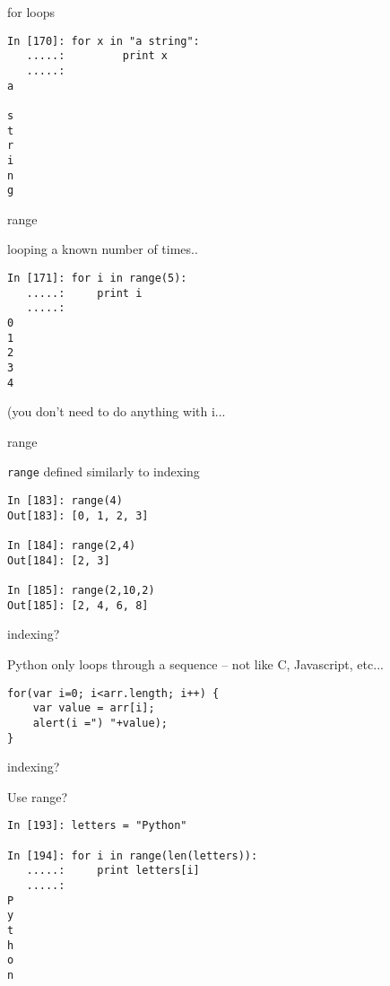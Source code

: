 \documentclass{beamer}
\begin{document}
\begin{frame}[fragile]{for loops}

\begin{verbatim}
In [170]: for x in "a string":
   .....:         print x
   .....:     
a
 
s
t
r
i
n
g
\end{verbatim}
\end{frame}

\begin{frame}[fragile]{range}

{\Large looping a known number of times..}

\begin{verbatim}
In [171]: for i in range(5):
   .....:     print i
   .....:     
0
1
2
3
4
\end{verbatim}
(you don't need to do anything with i...
\end{frame}

\begin{frame}[fragile]{range}

{\Large \verb|range| defined similarly to indexing}

\begin{verbatim}
In [183]: range(4)
Out[183]: [0, 1, 2, 3]

In [184]: range(2,4)
Out[184]: [2, 3]

In [185]: range(2,10,2)
Out[185]: [2, 4, 6, 8]
\end{verbatim}

\end{frame}

\begin{frame}[fragile]{indexing?}

{\Large Python only loops through a sequence -- not like C, Javascript, etc...}
\begin{verbatim}
for(var i=0; i<arr.length; i++) {
    var value = arr[i];
    alert(i =") "+value);
}
\end{verbatim}

\end{frame}

\begin{frame}[fragile]{indexing?}

{\Large Use range?}
\begin{verbatim}
In [193]: letters = "Python"

In [194]: for i in range(len(letters)):
   .....:     print letters[i]
   .....:     
P
y
t
h
o
n
\end{verbatim}

\end{frame}
\end{document}
